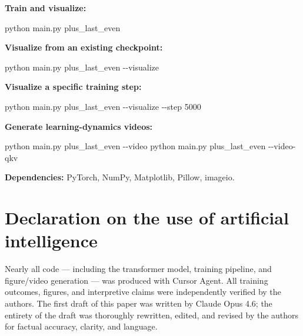 \documentclass[
  11pt,
  a4paper,
]{article}
\newenvironment{Shaded}{}{}
\newcommand{\AttributeTok}[1]{\textcolor[rgb]{0.49,0.56,0.16}{#1}}
\newcommand{\ExtensionTok}[1]{#1}
\newcommand{\NormalTok}[1]{#1}
\begin{document}
\textbf{Train and visualize:}

\begin{Shaded}
\begin{Highlighting}[]
\ExtensionTok{python}\NormalTok{ main.py plus\_last\_even}
\end{Highlighting}
\end{Shaded}

\textbf{Visualize from an existing checkpoint:}

\begin{Shaded}
\begin{Highlighting}[]
\ExtensionTok{python}\NormalTok{ main.py plus\_last\_even }\AttributeTok{{-}{-}visualize}
\end{Highlighting}
\end{Shaded}

\textbf{Visualize a specific training step:}

\begin{Shaded}
\begin{Highlighting}[]
\ExtensionTok{python}\NormalTok{ main.py plus\_last\_even }\AttributeTok{{-}{-}visualize} \AttributeTok{{-}{-}step}\NormalTok{ 5000}
\end{Highlighting}
\end{Shaded}

\textbf{Generate learning-dynamics videos:}

\begin{Shaded}
\begin{Highlighting}[]
\ExtensionTok{python}\NormalTok{ main.py plus\_last\_even }\AttributeTok{{-}{-}video}
\ExtensionTok{python}\NormalTok{ main.py plus\_last\_even }\AttributeTok{{-}{-}video{-}qkv}
\end{Highlighting}
\end{Shaded}

\textbf{Dependencies:} PyTorch, NumPy, Matplotlib, Pillow, imageio.

\section*{Declaration on the use of artificial intelligence}\label{declaration-on-the-use-of-artificial-intelligence}

Nearly all code --- including the transformer model, training pipeline,
and figure/video generation --- was produced with Cursor Agent. All
training outcomes, figures, and interpretive claims were independently
verified by the authors. The first draft of this paper was written by
Claude Opus 4.6; the entirety of the draft was thoroughly rewritten,
edited, and revised by the authors for factual accuracy, clarity, and
language.
\end{document}
